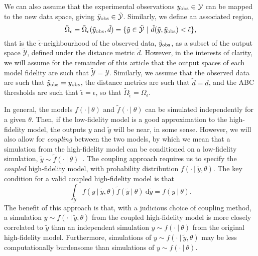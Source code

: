 \documentclass[review,demo]{siamonline190516}
\begin{document}
We can also assume that the experimental observations $y_{\mathrm{obs}} \in \mathcal Y$ can be mapped to the new data space, giving $\tilde y_{\mathrm{obs}} \in \tilde{\mathcal Y}$.
Similarly, we define an associated region,
\[
 \tilde \Omega_{\epsilon} = \tilde \Omega_{\epsilon} (\tilde y_{\mathrm{obs}}, \tilde d) = \{ \tilde y \in \tilde{\mathcal Y} ~|~ \tilde d(\tilde y,\tilde y_{\mathrm{obs}}) < \tilde \epsilon \},
\]
that is the $\tilde \epsilon$-neighbourhood of the observed data, $\tilde y_{\mathrm{obs}}$, as a subset of the output space $\tilde{\mathcal Y}$, defined under the distance metric $\tilde d$.
However, in the interests of clarity, we will assume for the remainder of this article that the output spaces of each model fidelity are such that $\tilde{\mathcal Y} = \mathcal Y$.
Similarly, we assume that the observed data are such that $\tilde y_{\mathrm{obs}} = y_{\mathrm{obs}}$, the distance metrics are such that $\tilde d = d$, and the ABC thresholds are such that $\tilde \epsilon = \epsilon$, so that $\tilde \Omega_{\tilde \epsilon} = \Omega_\epsilon$.

In general, the models $f(\cdot~|~\theta)$ and $\tilde f(\cdot~|~\theta)$ can be simulated independently for a given $\theta$.
Then, if the low-fidelity model is a good approximation to the high-fidelity model, the outputs $y$ and $\tilde y$ will be near, in some sense.
However, we will also allow for \emph{coupling} between the two models, 
by which we mean that a simulation from the high-fidelity model can be conditioned on a low-fidelity simulation, $\tilde y \sim \tilde f(\cdot~|~\theta)$~\cite{Giles2008}.
The coupling approach requires us to specify the \emph{coupled} high-fidelity model, with probability distribution $f(\cdot~|~\tilde y, \theta)$.
The key condition for a valid coupled high-fidelity model is that
\begin{equation}
\label{eq:coupling}
 \int_{\tilde{\mathcal{Y}}} f(y ~|~ \tilde y, \theta) \tilde f(\tilde y~|~\theta) ~\mathrm d\tilde y = f(y ~|~ \theta).
\end{equation}
The benefit of this approach is that, with a judicious choice of coupling method, a simulation $y \sim f(\cdot~|~\tilde y, \theta)$ from the coupled high-fidelity model is more closely correlated to $\tilde y$ than an independent simulation $y \sim f(\cdot~|~\theta)$ from the original high-fidelity model.
Furthermore, simulations of $y \sim f(\cdot~|~\tilde y, \theta)$ may be less computationally burdensome than simulations of $y \sim f(\cdot~|~\theta)$.
\end{document}

